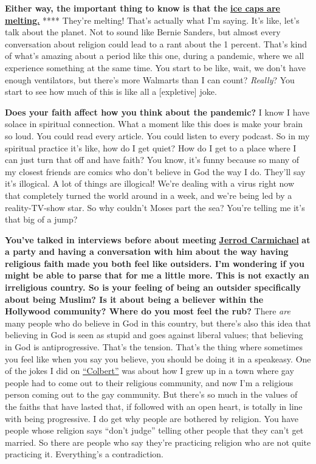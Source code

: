 \textbf{Either way, the important thing to know is that the}
\textbf{\href{http://nytimes3xbfgragh.onion\#tooltip-4}{ice caps are
melting.}} **** They're melting! That's actually what I'm saying. It's
like, let's talk about the planet. Not to sound like Bernie Sanders, but
almost every conversation about religion could lead to a rant about the
1 percent. That's kind of what's amazing about a period like this one,
during a pandemic, where we all experience something at the same time.
You start to be like, wait, we don't have enough ventilators, but
there's more Walmarts than I can count? \emph{Really}? You start to see
how much of this is like all a {[}expletive{]} joke.

\textbf{Does your faith affect how you think about the pandemic?} I know
I have solace in spiritual connection. What a moment like this does is
make your brain so loud. You could read every article. You could listen
to every podcast. So in my spiritual practice it's like, how do I get
quiet? How do I get to a place where I can just turn that off and have
faith? You know, it's funny because so many of my closest friends are
comics who don't believe in God the way I do. They'll say it's
illogical. A lot of things are illogical! We're dealing with a virus
right now that completely turned the world around in a week, and we're
being led by a reality-TV-show star. So why couldn't Moses part the sea?
You're telling me it's that big of a jump?

\textbf{You've talked in interviews before about meeting}
\textbf{\href{http://nytimes3xbfgragh.onion\#tooltip-5}{Jerrod
Carmichael}} \textbf{at a party and having a conversation with him about
the way having religious faith made you both feel like outsiders. I'm
wondering if you might be able to parse that for me a little more. This
is not exactly an irreligious country. So is your feeling of being an
outsider specifically about being Muslim? Is it about being a believer
within the Hollywood community? Where do you most feel the rub?} There
\emph{are} many people who do believe in God in this country, but
there's also this idea that believing in God is seen as stupid and goes
against liberal values; that believing in God is antiprogressive. That's
the tension. That's the thing where sometimes you feel like when you say
you believe, you should be doing it in a speakeasy. One of the jokes I
did on \href{http://nytimes3xbfgragh.onion\#tooltip-6}{``Colbert''} was
about how I grew up in a town where gay people had to come out to their
religious community, and now I'm a religious person coming out to the
gay community. But there's so much in the values of the faiths that have
lasted that, if followed with an open heart, is totally in line with
being progressive. I do get why people are bothered by religion. You
have people whose religion says ``don't judge'' telling other people
that they can't get married. So there are people who say they're
practicing religion who are not quite practicing it. Everything's a
contradiction.

